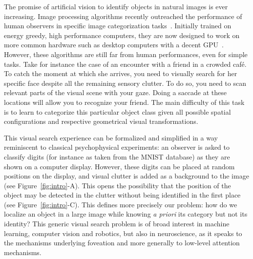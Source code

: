 The promise of artificial vision to identify objects in natural images is ever increasing. Image processing algorithms recently outreached the performance of human observers in specific image categorization tasks~\citep{He15}. Initially trained on energy greedy, high performance computers, they are now designed to work on more common hardware such as desktop computers with a decent GPU~\citep{Sandler18}. However, these algorithms are still far from human performances, even for simple tasks. Take for instance the case of an encounter with a friend in a crowded café. To catch the moment at which she arrives, you need to visually search for her specific face despite all the remaining sensory clutter. To do so, you need to scan relevant parts of the visual scene with your gaze. Doing a saccade at these locations will allow you to recognize your friend. The main difficulty of this task is to learn to categorize this particular object class given all possible spatial configurations and respective geometrical visual transformations. 

This visual search experience can be formalized and simplified in a way reminiscent to classical psychophysical experiments: an observer is asked to classify digits (for instance as taken from the MNIST database) as they are shown on a computer display. However, these digits can be placed at random positions on the display, and visual clutter is added as a background to the image (see Figure~\ref{fig:intro}-A). This opens the possibility that the position of the object may be detected in the clutter without being identified in the first place (see Figure~\ref{fig:intro}-C). This defines more precisely our problem: how do we localize an object in a large image while knowing \emph{a priori} its category but not its identity? This generic visual search problem is of broad interest in machine learning, computer vision and robotics, but also in neuroscience, as it speaks to the mechanisms underlying foveation and more generally to low-level attention mechanisms.

